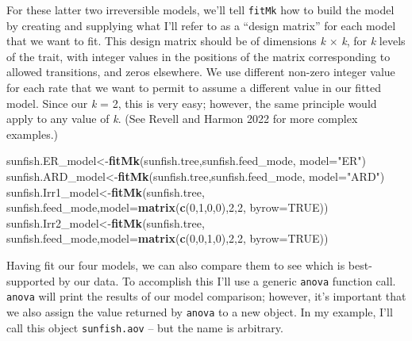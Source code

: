 \documentclass[fleqn,10pt,lineno]{wlpeerj} %
\newenvironment{Shaded}{\begin{snugshade}}{\end{snugshade}}
\newcommand{\AttributeTok}[1]{\textcolor[rgb]{0.13,0.29,0.53}{#1}}
\newcommand{\ConstantTok}[1]{\textcolor[rgb]{0.56,0.35,0.01}{#1}}
\newcommand{\DecValTok}[1]{\textcolor[rgb]{0.00,0.00,0.81}{#1}}
\newcommand{\FunctionTok}[1]{\textcolor[rgb]{0.13,0.29,0.53}{\textbf{#1}}}
\newcommand{\NormalTok}[1]{#1}
\newcommand{\OtherTok}[1]{\textcolor[rgb]{0.56,0.35,0.01}{#1}}
\newcommand{\StringTok}[1]{\textcolor[rgb]{0.31,0.60,0.02}{#1}}
\begin{document}
For these latter two irreversible models, we'll tell \texttt{fitMk} how to build the model by creating and supplying what I'll refer to as a ``design matrix'' for each model that we want to fit. This design matrix should be of dimensions \emph{k} \(\times\) \emph{k}, for \emph{k} levels of the trait, with integer values in the positions of the matrix corresponding to allowed transitions, and zeros elsewhere. We use different non-zero integer value for each rate that we want to permit to assume a different value in our fitted model. Since our \emph{k} = 2, this is very easy; however, the same principle would apply to any value of \emph{k}. (See Revell and Harmon 2022 for more complex examples.)

\begin{Shaded}
\begin{Highlighting}[]
\NormalTok{sunfish.ER\_model}\OtherTok{\textless{}{-}}\FunctionTok{fitMk}\NormalTok{(sunfish.tree,sunfish.feed\_mode,}
  \AttributeTok{model=}\StringTok{"ER"}\NormalTok{)}
\NormalTok{sunfish.ARD\_model}\OtherTok{\textless{}{-}}\FunctionTok{fitMk}\NormalTok{(sunfish.tree,sunfish.feed\_mode,}
  \AttributeTok{model=}\StringTok{"ARD"}\NormalTok{)}
\NormalTok{sunfish.Irr1\_model}\OtherTok{\textless{}{-}}\FunctionTok{fitMk}\NormalTok{(sunfish.tree,}
\NormalTok{  sunfish.feed\_mode,}\AttributeTok{model=}\FunctionTok{matrix}\NormalTok{(}\FunctionTok{c}\NormalTok{(}\DecValTok{0}\NormalTok{,}\DecValTok{1}\NormalTok{,}\DecValTok{0}\NormalTok{,}\DecValTok{0}\NormalTok{),}\DecValTok{2}\NormalTok{,}\DecValTok{2}\NormalTok{,}
  \AttributeTok{byrow=}\ConstantTok{TRUE}\NormalTok{))}
\NormalTok{sunfish.Irr2\_model}\OtherTok{\textless{}{-}}\FunctionTok{fitMk}\NormalTok{(sunfish.tree,}
\NormalTok{  sunfish.feed\_mode,}\AttributeTok{model=}\FunctionTok{matrix}\NormalTok{(}\FunctionTok{c}\NormalTok{(}\DecValTok{0}\NormalTok{,}\DecValTok{0}\NormalTok{,}\DecValTok{1}\NormalTok{,}\DecValTok{0}\NormalTok{),}\DecValTok{2}\NormalTok{,}\DecValTok{2}\NormalTok{,}
  \AttributeTok{byrow=}\ConstantTok{TRUE}\NormalTok{))}
\end{Highlighting}
\end{Shaded}

Having fit our four models, we can also compare them to see which is best-supported by our data. To accomplish this I'll use a generic \texttt{anova} function call. \texttt{anova} will print the results of our model comparison; however, it's important that we also assign the value returned by \texttt{anova} to a new object. In my example, I'll call this object \texttt{sunfish.aov} -- but the name is arbitrary.
\end{document}
